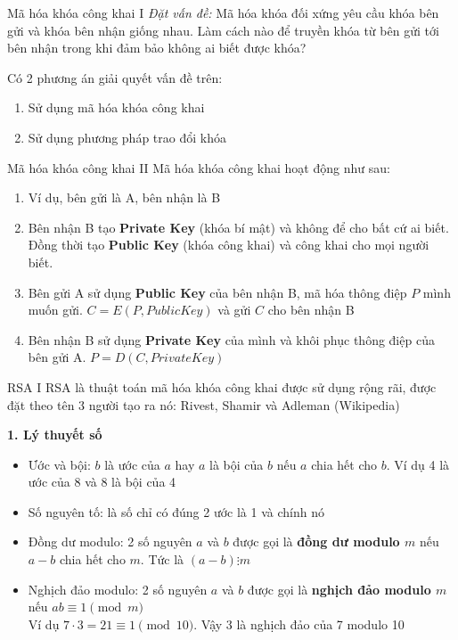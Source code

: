 \begin{frame}{Mã hóa khóa công khai I}
\textit{Đặt vấn đề:} Mã hóa khóa đối xứng yêu cầu khóa bên gửi và khóa bên nhận giống nhau. Làm cách nào để truyền khóa từ bên gửi tới bên nhận trong khi đảm bảo không ai biết được khóa?

Có 2 phương án giải quyết vấn đề trên:
\begin{enumerate}
    \item Sử dụng mã hóa khóa công khai
    \item Sử dụng phương pháp trao đổi khóa
\end{enumerate}
\end{frame}

\begin{frame}{Mã hóa khóa công khai II}
Mã hóa khóa công khai hoạt động như sau:

\begin{enumerate}
    \item Ví dụ, bên gửi là A, bên nhận là B
    \item Bên nhận B tạo \textbf{Private Key} (khóa bí mật) và không để cho bất cứ ai biết. Đồng thời tạo \textbf{Public Key} (khóa công khai) và công khai cho mọi người biết.
    \item Bên gửi A sử dụng \textbf{Public Key} của bên nhận B, mã hóa thông điệp $P$ mình muốn gửi. $C = E(P, PublicKey)$ và gửi $C$ cho bên nhận B
    \item Bên nhận B sử dụng \textbf{Private Key} của mình và khôi phục thông điệp của bên gửi A. $P = D(C, PrivateKey)$
\end{enumerate}
\end{frame}

\begin{frame}{RSA I}
RSA là thuật toán mã hóa khóa công khai được sử dụng rộng rãi, được đặt theo tên 3 người tạo ra nó: Rivest, Shamir và Adleman (Wikipedia)

\textbf{1. Lý thuyết số}

\begin{itemize}
    \item Ước và bội: $b$ là ước của $a$ hay $a$ là bội của $b$ nếu $a$ chia hết cho $b$. Ví dụ 4 là ước của 8 và 8 là bội của 4
    \item Số nguyên tố: là số chỉ có đúng 2 ước là 1 và chính nó
    \item Đồng dư modulo: 2 số nguyên $a$ và $b$ được gọi là \textbf{đồng dư modulo $m$} nếu $a-b$ chia hết cho $m$. Tức là $(a-b) \vdots m$
    \item Nghịch đảo modulo: 2 số nguyên $a$ và $b$ được gọi là \textbf{nghịch đảo modulo $m$} nếu $ab \equiv 1 \pmod m$ \\ Ví dụ $7 \cdot 3 = 21 \equiv 1 \pmod{10}$. Vậy 3 là nghịch đảo của 7 modulo 10
\end{itemize}
\end{frame}

